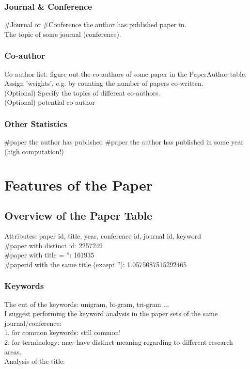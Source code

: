 \documentclass[12pt,a4paper]{article}
\begin{document}
\subsubsection{Journal \& Conference}
\#Journal or \#Conference the author has published paper in.\\
The topic of some journal (conference).

\subsubsection{Co-author}
Co-author list: figure out the co-authors of some paper in the PaperAuthor table.\\
Assign 'weights', e.g. by counting the number of papers co-written.\\
(Optional) Specify the topics of different co-authors.\\
(Optional) potential co-author

\subsubsection{Other Statistics}
\#paper the author has published
\#paper the author has published in some year (high computation!)

\section{Features of the Paper}
\subsection{Overview of the Paper Table}
Attributes: paper id, title, year, conference id, journal id, keyword\\
\#paper with distinct id: 2257249\\
\#paper with title = '': 161935\\
\#paperid with the same title (except ''): 1.0575087515292465

\subsubsection{Keywords}
The cut of the keywords: unigram, bi-gram, tri-gram ...\\
I suggest performing the keyword analysis in the paper sets of the same journal/conference:\\
1. for common keywords: still common!\\
2. for terminology: may have distinct meaning regarding to different research areas.\\
Analysis of the title:
\end{document}
